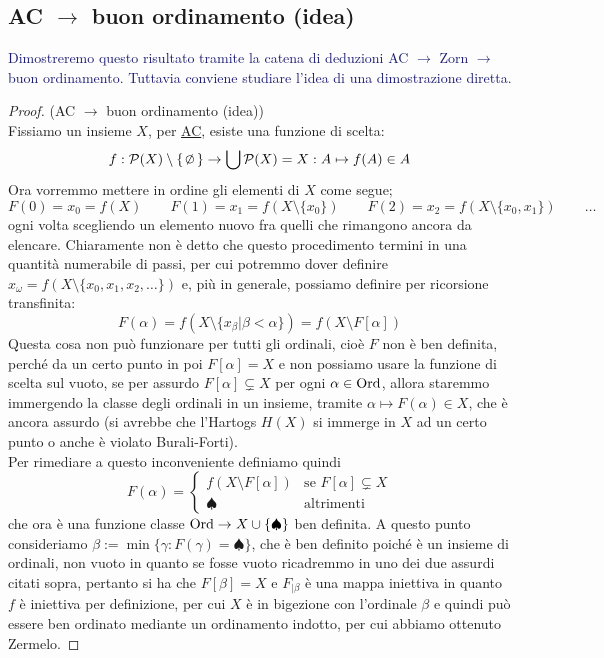 \subsection{\texorpdfstring{AC $\rightarrow$ buon ordinamento (idea)}{AC implica buon ordinamento (idea)}}
\textcolor{MidnightBlue}{Dimostreremo questo risultato tramite la catena di deduzioni AC $\rightarrow$ Zorn $\rightarrow$ buon ordinamento. Tuttavia conviene studiare l'idea di una dimostrazione diretta.}

\begin{proof}
	(AC $\rightarrow$ buon ordinamento (idea))\\
	Fissiamo un insieme $X$, per \hyperref[ax9]{AC}, esiste una funzione di scelta:
	\[ f : \ps(X) \setminus\{\emptyset\} \rightarrow \bigcup \ps(X) = X : A \mapsto f(A) \in A
		\]
	Ora vorremmo mettere in ordine gli elementi di $X$ come segue;
	\[ F(0) = x_0 = f(X) \qquad F(1) = x_1 = f(X \setminus \{x_0\}) \qquad F(2) = x_2 = f(X \setminus \{x_0,x_1\}) \qquad\ldots
		\]
	ogni volta scegliendo un elemento nuovo fra quelli che rimangono ancora da elencare. Chiaramente non \`e detto che questo procedimento termini
	in una quantit\`a numerabile di passi, per cui potremmo dover definire $x_\omega = f(X\setminus\{x_0,x_1,x_2,\ldots\})$ e, pi\`u in generale, possiamo definire per ricorsione transfinita:
	\[ F(\alpha) = f(X \setminus\{x_\beta | \beta < \alpha\}) = f(X \setminus F[\alpha])
		\]
	Questa cosa non pu\`o funzionare per tutti gli ordinali, cio\`e $F$ non \`e ben definita, perch\'e da un certo punto in poi $F[\alpha] = X$ e non possiamo usare la funzione di scelta sul vuoto, se per assurdo $F[\alpha] \subsetneq X$ per ogni $\alpha \in \operatorname{Ord}$, allora staremmo immergendo la classe degli ordinali in un insieme, tramite $\alpha \mapsto F(\alpha) \in X$,
	che \`e ancora assurdo (si avrebbe che l'Hartogs $H(X)$ si immerge in $X$ ad un certo punto o anche \`e violato Burali-Forti).\\
	Per rimediare a questo inconveniente definiamo quindi
	\[ F(\alpha) = \begin{cases}
		f(X \setminus F[\alpha]) &\text{se $F[\alpha] \subsetneq X$} \\
		\spadesuit &\text{altrimenti}
	\end{cases}
		\] 
	che ora \`e una funzione classe $\operatorname{Ord} \to X \cup \{\spadesuit\}$ ben definita. A questo punto consideriamo $\beta := \min\{\gamma : F(\gamma) = \spadesuit\}$, che \`e ben definito poich\'e \`e un insieme di ordinali, non vuoto in 
	quanto se fosse vuoto ricadremmo in uno dei due assurdi citati sopra, pertanto si ha che $F[\beta] = X$ e $F_{|\beta}$ \`e una mappa iniettiva in quanto $f$ \`e iniettiva per definizione, per cui $X$ \`e in bigezione con l'ordinale $\beta$
	e quindi pu\`o essere ben ordinato mediante un ordinamento indotto, per cui abbiamo ottenuto Zermelo.
\end{proof}

